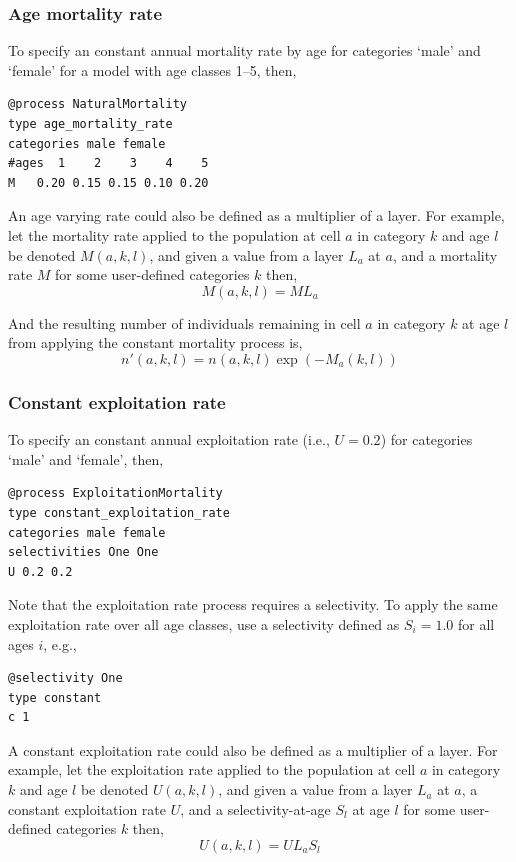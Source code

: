 \subsubsection*{Age mortality rate}

To specify an constant annual mortality rate by age  for categories `male' and `female' for a model with age classes 1--5, then, 
{\small{\begin{verbatim}
@process NaturalMortality
type age_mortality_rate
categories male female
#ages  1    2    3    4    5 
M   0.20 0.15 0.15 0.10 0.20
\end{verbatim}}}

An age varying rate could also be defined as a multiplier of a layer. For example, let the mortality rate applied to the population at cell $a$ in category $k$ and age $l$ be denoted $M(a,k,l)$, and given a value from a layer $L_a$  at $a$, and a mortality rate $M$ for some user-defined categories $k$ then, 
\begin{equation}
  M(a,k,l) = ML_a
\end{equation}

And the resulting number of individuals remaining in cell $a$ in category $k$ at age $l$ from applying the constant mortality process is,
\begin{equation}
  n'(a,k,l) = n(a,k,l) \exp \left({-M_a(k,l)}\right)
\end{equation}


\subsubsection*{Constant exploitation rate}

To specify an constant annual exploitation rate (i.e., $U=0.2$) for categories `male' and `female', then, 
{\small{\begin{verbatim}
@process ExploitationMortality
type constant_exploitation_rate
categories male female
selectivities One One
U 0.2 0.2
\end{verbatim}}}

Note that the exploitation rate process requires a selectivity. To apply the same exploitation rate over all age classes, use a selectivity defined as $S_i=1.0$ for all ages $i$, e.g.,
{\small{\begin{verbatim}
@selectivity One
type constant
c 1
\end{verbatim}}}

A constant exploitation rate could also be defined as a multiplier of a layer. For example, let the exploitation rate applied to the population at cell $a$ in category $k$ and age $l$ be denoted $U(a,k,l)$, and given a value from a layer $L_a$  at $a$, a constant exploitation rate $U$, and a selectivity-at-age $S_l$ at age $l$ for some user-defined categories $k$ then, 
\begin{equation}
  U(a,k,l) = U L_a S_l 
\end{equation}

